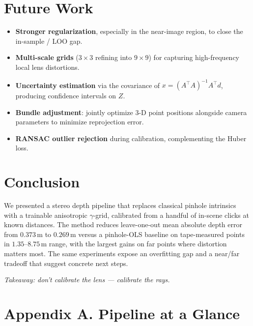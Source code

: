 \documentclass[11pt]{article}
\begin{document}
\section{Future Work}

\begin{itemize}[leftmargin=2em]
  \item \textbf{Stronger regularization}, especially in the near-image region, to close
        the in-sample / LOO gap.
  \item \textbf{Multi-scale grids} ($3 \times 3$ refining into $9 \times 9$) for capturing
        high-frequency local lens distortions.
  \item \textbf{Uncertainty estimation} via the covariance of $x = (A^\top A)^{-1} A^\top
        d$, producing confidence intervals on $Z$.
  \item \textbf{Bundle adjustment}: jointly optimize 3-D point positions alongside camera
        parameters to minimize reprojection error.
  \item \textbf{RANSAC outlier rejection} during calibration, complementing the Huber
        loss.
\end{itemize}

\section{Conclusion}

We presented a stereo depth pipeline that replaces classical pinhole intrinsics with a
trainable anisotropic $\gamma$-grid, calibrated from a handful of in-scene clicks at
known distances. The method reduces leave-one-out mean absolute depth error from
$0.373$\,m to $0.269$\,m versus a pinhole-OLS baseline on tape-measured points in
$1.35$--$8.75$\,m range, with the largest gains on far points where distortion matters
most. The same experiments expose an overfitting gap and a near/far tradeoff that
suggest concrete next steps. \medskip

\noindent\textit{Takeaway: don't calibrate the lens --- calibrate the rays.}

\section*{Appendix A. Pipeline at a Glance}
\end{document}
